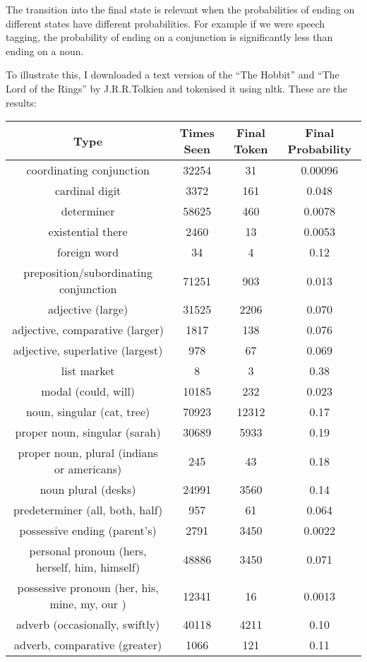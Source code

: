 \documentclass[10pt,\jkfside,a4paper]{article}
\begin{document}
\begin{enumerate}
The transition into the final state is relevant when the probabilities of 
ending on different states have different probabilities. For example if we 
were speech tagging, the probability of ending on a conjunction is significantly 
less than ending on a noun.

To illustrate this, I downloaded a text version of the ``The Hobbit'' and ``The Lord of the Rings'' 
by J.R.R.Tolkien and tokenised it using nltk. These are the results:

\begin{center}
\begin{tabular}{c|c|c|c}
Type & Times Seen & Final Token & Final Probability \\
\hline
coordinating conjunction & 32254 & 31 & 0.00096 \\
cardinal digit & 3372 & 161 & 0.048 \\
determiner & 58625 & 460 & 0.0078 \\
existential there & 2460 & 13 & 0.0053 \\
foreign word & 34 & 4 & 0.12 \\
preposition/subordinating conjunction & 71251 & 903 & 0.013 \\
adjective (large) & 31525 & 2206 & 0.070 \\
adjective, comparative (larger) & 1817 & 138 & 0.076 \\
adjective, superlative (largest) & 978 & 67 & 0.069 \\
list market & 8 & 3 & 0.38 \\
modal (could, will) & 10185 & 232 & 0.023 \\
noun, singular (cat, tree) & 70923 & 12312 & 0.17 \\
proper noun, singular (sarah) & 30689 & 5933 & 0.19 \\
proper noun, plural (indians or americans) & 245 & 43 & 0.18 \\
noun plural (desks) & 24991 & 3560 & 0.14 \\
predeterminer (all, both, half) & 957 & 61 & 0.064 \\
possessive ending (parent's) & 2791 & 3450 & 0.0022 \\
personal pronoun (hers, herself, him, himself) & 48886 & 3450 & 0.071 \\
possessive pronoun (her, his, mine, my, our ) & 12341 & 16 & 0.0013 \\
adverb (occasionally, swiftly) & 40118 & 4211 & 0.10 \\
adverb, comparative (greater) & 1066 & 121 & 0.11 \\

\end{tabular}
\end{center}
\end{enumerate}
\end{document}

